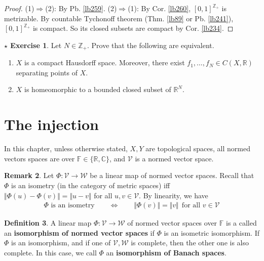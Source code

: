 \documentclass[12pt,b5paper,notitlepage]{article}
\theoremstyle{definition}
\newtheorem{df}{Definition}[section]
\newtheorem{rem}[df]{Remark}
\newtheorem{sexe}[df]{$\star$ Exercise}
\theoremstyle{plain}
\newcommand{\mc}{\mathcal}
\newcommand{\Cbb}{\mathbb C}
\newcommand{\Zbb}{\mathbb Z}
\newcommand{\Rbb}{\mathbb R}
\newcommand{\Fbb}{\mathbb F}
\numberwithin{equation}{section}
\begin{document}
\begin{proof}
(1)$\Rightarrow$(2): By Pb. \ref{lb259}. (2)$\Rightarrow$(1): By Cor. \ref{lb260}, $[0,1]^{\Zbb_+}$ is metrizable. By countable Tychonoff theorem (Thm. \ref{lb89} or Pb. \ref{lb241}), $[0,1]^{\Zbb_+}$ is compact. So its closed subsets are compact by Cor. \ref{lb234}.
\end{proof}



\begin{sexe}
Let $N\in\Zbb_+$. Prove that the following are equivalent.
\begin{enumerate}[label=(\arabic*)]
\item $X$ is a compact Hausdorff space. Moreover, there exist $f_1,\dots,f_N\in C(X,\Rbb)$ separating points of $X$.
\item $X$ is homeomorphic to a bounded closed subset of $\Rbb^N$.
\end{enumerate}
\end{sexe}


\newpage

\section{The injection \pmb{$\Psi:C(X,C(Y,\mc V))\rightarrow C(X\times Y,\mc V)$}}\label{lb352}





In this chapter, unless otherwise stated,  $X,Y$ are topological spaces, all normed vectors spaces are over $\Fbb\in\{\Rbb,\Cbb\}$, and $\mc V$ is a normed vector space.

\begin{rem}
Let $\Phi:\mc V\rightarrow\mc W$ be a linear map of normed vector spaces. Recall that $\Phi$ is an isometry (in the category of metric spaces) iff $\Vert \Phi(u)-\Phi(v)\Vert=\Vert u-v\Vert$ for all $u,v\in\mc V$. By linearity, we have
\begin{align}
\Phi\text{ is an isometry}\qquad \Longleftrightarrow\qquad \Vert\Phi(v)\Vert=\Vert v\Vert~~\text{for all } v\in\mc V
\end{align}
\end{rem}


\begin{df}\label{lb302}
A linear map $\Phi:\mc V\rightarrow\mc W$ of normed vector spaces over $\Fbb$ is a called an \textbf{isomorphism of normed vector spaces}  if $\Phi$ is an isometric isomorphism. If $\Phi$ is an isomorphism, and if one of $\mc V,\mc W$ is complete, then the other one is also complete. In this case, we call $\Phi$ an \textbf{isomorphism of Banach spaces}.
\end{df}
\end{document}
